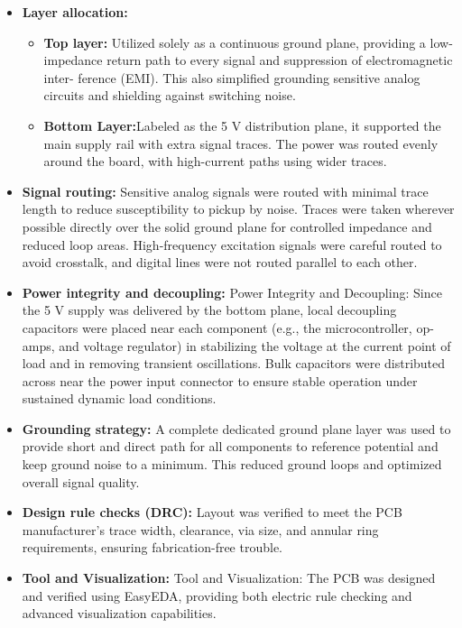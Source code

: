 \begin{itemize}
    \item \textbf{Layer allocation:}  
    \begin{itemize}
        \item \textbf{Top layer:} Utilized solely as a continuous ground plane, providing a low-
impedance return path to every signal and suppression of electromagnetic inter-
ference (EMI). This also simplified grounding sensitive analog circuits and
shielding against switching noise.  
        \item \textbf{Bottom Layer:}Labeled as the 5 V distribution plane, it supported the main
supply rail with extra signal traces. The power was routed evenly around the
board, with high-current paths using wider traces.  
    \end{itemize}


    \item \textbf{Signal routing:}  
    Sensitive analog signals were routed with minimal trace length to
reduce susceptibility to pickup by noise. Traces were taken wherever possible directly
over the solid ground plane for controlled impedance and reduced loop areas.
High-frequency excitation signals were careful routed to avoid crosstalk, and digital lines
were not routed parallel to each other.

    \item \textbf{Power integrity and decoupling:}  
    Power Integrity and Decoupling: Since the 5 V supply was delivered by the bottom plane, local decoupling capacitors were placed near each component (e.g.,
the microcontroller, op-amps, and voltage regulator) in stabilizing the voltage at the current point of load and in removing transient oscillations. Bulk capacitors were distributed across near the power input connector to ensure stable operation under sustained dynamic load conditions.  

    \item \textbf{Grounding strategy:}  
    A complete dedicated ground plane layer was used to provide short and direct path for all components to reference potential and keep ground noise to a minimum. This reduced ground loops and optimized overall signal quality. 

    \item \textbf{Design rule checks (DRC):}  
    Layout was verified to meet the PCB manufacturer's trace width, clearance, via size, and annular ring requirements, ensuring fabrication-free trouble.
    \item \textbf{Tool and Visualization:}  
  Tool and Visualization: The PCB was designed and verified using EasyEDA, providing both electric rule checking and advanced visualization capabilities. \\

\end{itemize}
